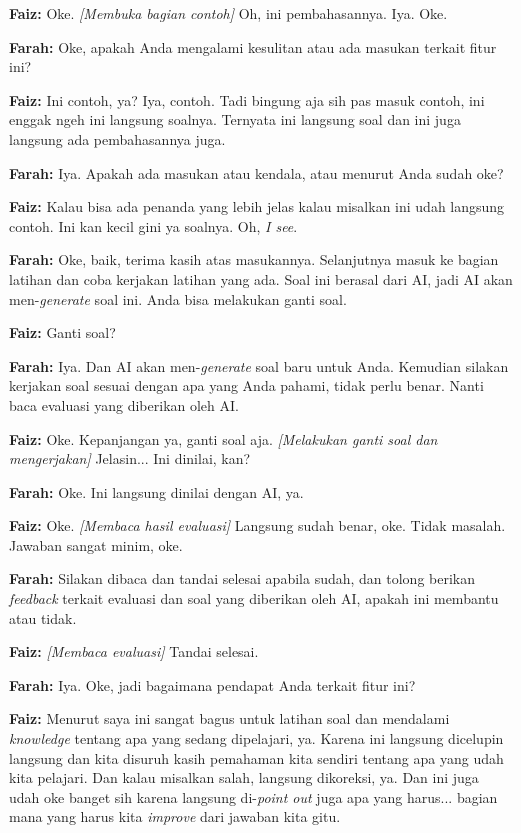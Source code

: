 \textbf{Faiz:} Oke. \textit{[Membuka bagian contoh]} Oh, ini pembahasannya. Iya. Oke.

\textbf{Farah:} Oke, apakah Anda mengalami kesulitan atau ada masukan terkait fitur ini?

\textbf{Faiz:} Ini contoh, ya? Iya, contoh. Tadi bingung aja sih pas masuk contoh, ini enggak ngeh ini langsung soalnya. Ternyata ini langsung soal dan ini juga langsung ada pembahasannya juga.

\textbf{Farah:} Iya. Apakah ada masukan atau kendala, atau menurut Anda sudah oke?

\textbf{Faiz:} Kalau bisa ada penanda yang lebih jelas kalau misalkan ini udah langsung contoh. Ini kan kecil gini ya soalnya. Oh, \textit{I see}.

\textbf{Farah:} Oke, baik, terima kasih atas masukannya. Selanjutnya masuk ke bagian latihan dan coba kerjakan latihan yang ada. Soal ini berasal dari AI, jadi AI akan men-\textit{generate} soal ini. Anda bisa melakukan ganti soal.

\textbf{Faiz:} Ganti soal?

\textbf{Farah:} Iya. Dan AI akan men-\textit{generate} soal baru untuk Anda. Kemudian silakan kerjakan soal sesuai dengan apa yang Anda pahami, tidak perlu benar. Nanti baca evaluasi yang diberikan oleh AI.

\textbf{Faiz:} Oke. Kepanjangan ya, ganti soal aja. \textit{[Melakukan ganti soal dan mengerjakan]} Jelasin... Ini dinilai, kan?

\textbf{Farah:} Oke. Ini langsung dinilai dengan AI, ya.

\textbf{Faiz:} Oke. \textit{[Membaca hasil evaluasi]} Langsung sudah benar, oke. Tidak masalah. Jawaban sangat minim, oke.

\textbf{Farah:} Silakan dibaca dan tandai selesai apabila sudah, dan tolong berikan \textit{feedback} terkait evaluasi dan soal yang diberikan oleh AI, apakah ini membantu atau tidak.

\textbf{Faiz:} \textit{[Membaca evaluasi]} Tandai selesai.

\textbf{Farah:} Iya. Oke, jadi bagaimana pendapat Anda terkait fitur ini?

\textbf{Faiz:} Menurut saya ini sangat bagus untuk latihan soal dan mendalami \textit{knowledge} tentang apa yang sedang dipelajari, ya. Karena ini langsung dicelupin langsung dan kita disuruh kasih pemahaman kita sendiri tentang apa yang udah kita pelajari. Dan kalau misalkan salah, langsung dikoreksi, ya. Dan ini juga udah oke banget sih karena langsung di-\textit{point out} juga apa yang harus... bagian mana yang harus kita \textit{improve} dari jawaban kita gitu.

